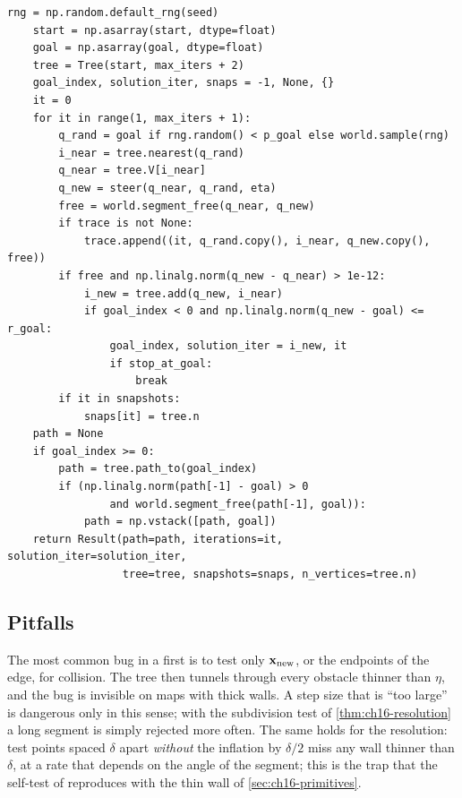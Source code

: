 \begin{lstlisting}[caption={The loop of \code{rrt(world, start, goal, eta, p\_goal, r\_goal, max\_iters, seed, ...)} (from \code{code/ch16\_rrt.py}). \code{Tree} stores the vertices in a growing array with parent indices; \code{steer} is \cref{eq:ch16-steer}; the goal itself is appended to the path when the last segment is free.},label={lst:ch16-rrt}]
    rng = np.random.default_rng(seed)
    start = np.asarray(start, dtype=float)
    goal = np.asarray(goal, dtype=float)
    tree = Tree(start, max_iters + 2)
    goal_index, solution_iter, snaps = -1, None, {}
    it = 0
    for it in range(1, max_iters + 1):
        q_rand = goal if rng.random() < p_goal else world.sample(rng)
        i_near = tree.nearest(q_rand)
        q_near = tree.V[i_near]
        q_new = steer(q_near, q_rand, eta)
        free = world.segment_free(q_near, q_new)
        if trace is not None:
            trace.append((it, q_rand.copy(), i_near, q_new.copy(), free))
        if free and np.linalg.norm(q_new - q_near) > 1e-12:
            i_new = tree.add(q_new, i_near)
            if goal_index < 0 and np.linalg.norm(q_new - goal) <= r_goal:
                goal_index, solution_iter = i_new, it
                if stop_at_goal:
                    break
        if it in snapshots:
            snaps[it] = tree.n
    path = None
    if goal_index >= 0:
        path = tree.path_to(goal_index)
        if (np.linalg.norm(path[-1] - goal) > 0
                and world.segment_free(path[-1], goal)):
            path = np.vstack([path, goal])
    return Result(path=path, iterations=it, solution_iter=solution_iter,
                  tree=tree, snapshots=snaps, n_vertices=tree.n)
\end{lstlisting}

\subsection{Pitfalls}
\label{sec:ch16-pitfalls}

\begin{pitfall}
The most common bug in a first \rrt is to test only $\mathbf{x}_{\mathrm{new}}$, or
the endpoints of the edge, for collision. The tree then tunnels through every
obstacle thinner than $\eta$, and the bug is invisible on maps with thick
walls. A step size that is ``too large'' is dangerous only in this sense;
with the subdivision test of \cref{thm:ch16-resolution} a long segment is
simply rejected more often. The same holds for the resolution: test points
spaced $\delta$ apart \emph{without} the inflation by $\delta/2$ miss any
wall thinner than $\delta$, at a rate that depends on the angle of the
segment; this is the trap that the self-test of 
reproduces with the thin wall of \cref{sec:ch16-primitives}.
\end{pitfall}


